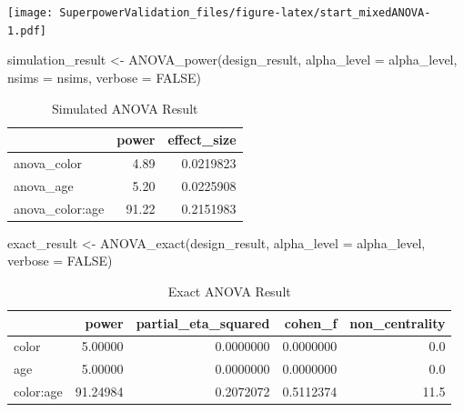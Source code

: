 \documentclass[
]{book}
\newenvironment{Shaded}{\begin{snugshade}}{\end{snugshade}}
\newcommand{\AttributeTok}[1]{\textcolor[rgb]{0.77,0.63,0.00}{#1}}
\newcommand{\ConstantTok}[1]{\textcolor[rgb]{0.00,0.00,0.00}{#1}}
\newcommand{\FunctionTok}[1]{\textcolor[rgb]{0.00,0.00,0.00}{#1}}
\newcommand{\NormalTok}[1]{#1}
\newcommand{\OtherTok}[1]{\textcolor[rgb]{0.56,0.35,0.01}{#1}}
\begin{document}
\texttt{[image: SuperpowerValidation\_files/figure-latex/start\_mixedANOVA-1.pdf]}

\begin{Shaded}
\begin{Highlighting}[]
\NormalTok{simulation\_result }\OtherTok{\textless{}{-}} \FunctionTok{ANOVA\_power}\NormalTok{(design\_result, }
                                 \AttributeTok{alpha\_level =}\NormalTok{ alpha\_level, }
                                 \AttributeTok{nsims =}\NormalTok{ nsims,}
                                 \AttributeTok{verbose =} \ConstantTok{FALSE}\NormalTok{)}
\end{Highlighting}
\end{Shaded}

\begin{table}[!h]

\caption{\label{tab:unnamed-chunk-152}Simulated ANOVA Result}
\centering
\begin{tabular}[t]{l|r|r}
\hline
  & power & effect\_size\\
\hline
anova\_color & 4.89 & 0.0219823\\
\hline
anova\_age & 5.20 & 0.0225908\\
\hline
anova\_color:age & 91.22 & 0.2151983\\
\hline
\end{tabular}
\end{table}

\begin{Shaded}
\begin{Highlighting}[]
\NormalTok{exact\_result }\OtherTok{\textless{}{-}} \FunctionTok{ANOVA\_exact}\NormalTok{(design\_result,}
                            \AttributeTok{alpha\_level =}\NormalTok{ alpha\_level,}
                            \AttributeTok{verbose =} \ConstantTok{FALSE}\NormalTok{)}
\end{Highlighting}
\end{Shaded}

\begin{table}[!h]

\caption{\label{tab:unnamed-chunk-154}Exact ANOVA Result}
\centering
\begin{tabular}[t]{l|r|r|r|r}
\hline
  & power & partial\_eta\_squared & cohen\_f & non\_centrality\\
\hline
color & 5.00000 & 0.0000000 & 0.0000000 & 0.0\\
\hline
age & 5.00000 & 0.0000000 & 0.0000000 & 0.0\\
\hline
color:age & 91.24984 & 0.2072072 & 0.5112374 & 11.5\\
\hline
\end{tabular}
\end{table}
\end{document}
